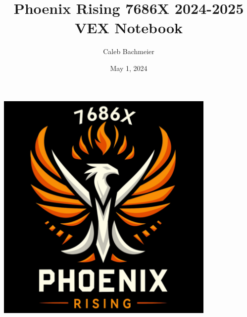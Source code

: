 \documentclass[oneside]{book}
\makeatletter
\renewcommand{\maketitle}{%
  \begin{titlepage}
    \centering
    \vspace*{1cm}
    \includegraphics[width=0.8\textwidth]{images/Phoenix_Logo_Black.png} \par
    \vspace*{2cm}
    {\Huge\bfseries\@title\par}
    \vspace*{1cm}
    {\Large\@author\par}
    \vspace*{1cm}
    {\large\@date\par}
    \vfill
  \end{titlepage}
}
\makeatother
\begin{document}
\RaggedRight
\let\cleardoublepage\clearpage 

\title{Phoenix Rising 7686X 2024-2025 VEX Notebook}
\author{Caleb Bachmeier}
\date{May 1, 2024}
\maketitle
\newpage
\thispagestyle{empty}
\mbox{}
\newpage

\tableofcontents











\printbibliography

\end{document}
